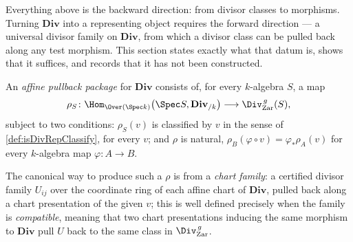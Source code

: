Everything above is the backward direction: from divisor classes to morphisms. Turning
\(\mathbf{Div}\) into a representing object requires the forward direction --- a universal
divisor family on \(\mathbf{Div}\), from which a divisor class can be pulled back along any
test morphism. This section states exactly what that datum is, shows that it suffices, and
records that it has not been constructed.

\begin{definition}
  \label{def:divRepAffinePullback}
  \leanok
  An \emph{affine pullback package} for \(\mathbf{Div}\) consists of, for every
  \(k\)-algebra \(S\), a map
  \[
    \rho_S \colon \Hom_{\Over(\Spec k)}\bigl(\Spec S, \mathbf{Div}_{/k}\bigr)
      \longrightarrow \Div^{\,g}_{\mathrm{Zar}}(S),
  \]
  subject to two conditions: \(\rho_S(v)\) is classified by \(v\) in the sense of
  \ref{def:isDivRepClassify}, for every \(v\); and \(\rho\) is natural, \(\rho_B(\varphi
  \circ v) = \varphi_* \rho_A(v)\) for every \(k\)-algebra map \(\varphi \colon A \to B\).

  The canonical way to produce such a \(\rho\) is from a \emph{chart family}: a certified
  divisor family \(U_{ij}\) over the coordinate ring of each affine chart of
  \(\mathbf{Div}\), pulled back along a chart presentation of the given \(v\); this is well
  defined precisely when the family is \emph{compatible}, meaning that two chart
  presentations inducing the same morphism to \(\mathbf{Div}\) pull \(U\) back to the same
  class in \(\Div^{\,g}_{\mathrm{Zar}}\).
\end{definition}

